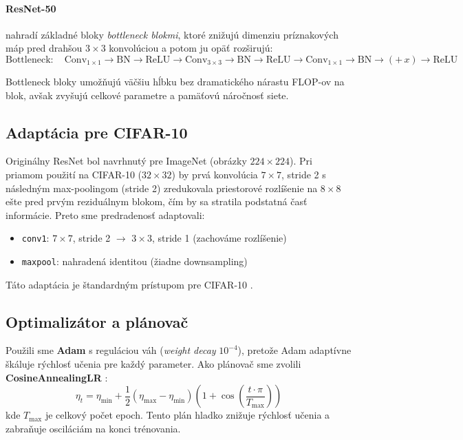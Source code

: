\documentclass[12pt,a4paper]{article}
\begin{document}
\paragraph{ResNet-50} nahradí základné bloky \textit{bottleneck blokmi}, ktoré
znižujú dimenziu príznakových máp pred drahšou $3 \times 3$ konvolúciou a potom
ju opäť rozširujú:
\begin{equation}
  \text{Bottleneck}: \quad \text{Conv}_{1\times1} \to \text{BN} \to \text{ReLU}
                        \to \text{Conv}_{3\times3} \to \text{BN} \to \text{ReLU}
                        \to \text{Conv}_{1\times1} \to \text{BN} \to (+\,x) \to \text{ReLU}
\end{equation}

Bottleneck bloky umožňujú väčšiu hĺbku bez dramatického nárastu FLOP-ov na blok,
avšak zvyšujú celkové parametre a pamäťovú náročnosť siete.

\subsection{Adaptácia pre CIFAR-10}

Originálny ResNet bol navrhnutý pre ImageNet (obrázky $224 \times 224$). Pri priamom
použití na CIFAR-10 ($32 \times 32$) by prvá konvolúcia $7 \times 7$, stride 2 s
následným max-poolingom (stride 2) zredukovala priestorové rozlíšenie na $8 \times 8$
ešte pred prvým reziduálnym blokom, čím by sa stratila podstatná časť informácie.
Preto sme predradenosť adaptovali:
\begin{itemize}
  \item \texttt{conv1}: $7 \times 7$, stride 2 $\to$ $3 \times 3$, stride 1 (zachováme rozlíšenie)
  \item \texttt{maxpool}: nahradená identitou (žiadne downsampling)
\end{itemize}
Táto adaptácia je štandardným prístupom pre CIFAR-10 \cite{he2016deep}.

\subsection{Optimalizátor a plánovač}

Použili sme \textbf{Adam} \cite{kingma2015adam} s reguláciou váh (\textit{weight decay} $10^{-4}$),
pretože Adam adaptívne škáluje rýchlosť učenia pre každý parameter.
Ako plánovač sme zvolili \textbf{CosineAnnealingLR} \cite{loshchilov2017sgdr}:
\begin{equation}
  \eta_t = \eta_{\min} + \frac{1}{2}(\eta_{\max} - \eta_{\min})
           \left(1 + \cos\!\left(\frac{t \cdot \pi}{T_{\max}}\right)\right)
\end{equation}
kde $T_{\max}$ je celkový počet epoch. Tento plán hladko znižuje rýchlosť učenia
a zabraňuje osciláciám na konci trénovania.
\end{document}
